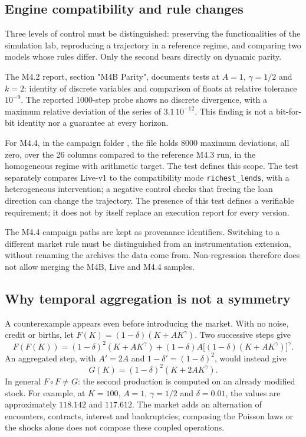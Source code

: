 \subsection{Engine compatibility and rule changes}
\label{sec:compatibilite}
Three levels of control must be distinguished: preserving the
functionalities of the simulation lab, reproducing a trajectory
in a reference regime, and comparing two models whose rules
differ. Only the second bears directly on dynamic parity.

The M4.2 report, section "M4B Parity", documents tests at
$A=1$, $\gamma=1/2$ and $k=2$: identity of discrete variables
and comparison of floats at relative tolerance $10^{-9}$.
The reported 1000-step probe shows no discrete divergence,
with a maximum relative deviation of the series of $3.1\,10^{-12}$.
This finding is not a bit-for-bit identity nor a guarantee at every horizon.

For M4.4, in the campaign folder
, the file
holds 8000 maximum deviations, all zero, over the 26 columns compared to
the reference M4.3 run, in the homogeneous regime with arithmetic
target. The test  defines this
scope. The test  separately compares
Live-v1 to the compatibility mode
\texttt{richest\_lends}, with a heterogeneous intervention; a negative
control checks that freeing the loan direction can change the trajectory.
The presence of this test defines a verifiable requirement; it does not by
itself replace an execution report for every version.

The M4.4 campaign paths are kept as provenance identifiers. Switching
to a different market rule must be distinguished from an instrumentation
extension, without renaming the archives the data come from. Non-regression
therefore does not allow merging the M4B, Live and M4.4 samples.

\subsection{Why temporal aggregation is not a symmetry}
\label{sec:composition_temps}
A counterexample appears even before introducing the market. With no noise,
credit or births, let $F(K)=(1-\delta)(K+AK^\gamma)$.
Two successive steps give
\[
F(F(K))=(1-\delta)^2(K+AK^\gamma)
 +(1-\delta)A\big[(1-\delta)(K+AK^\gamma)\big]^\gamma.
\]
An aggregated step, with $A'=2A$ and
$1-\delta'=(1-\delta)^2$, would instead give
\[
G(K)=(1-\delta)^2(K+2AK^\gamma).
\]
In general $F\circ F\ne G$: the second production is computed on
an already modified stock. For example, at $K=100$, $A=1$,
$\gamma=1/2$ and $\delta=0.01$, the values are approximately
$118.142$ and $117.612$. The market adds an alternation of
encounters, contracts, interest and bankruptcies; composing the Poisson
laws or the shocks alone does not compose these coupled operations.

